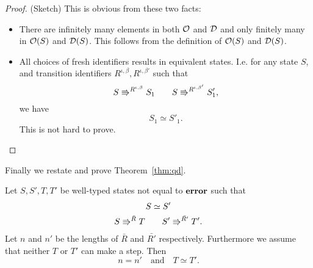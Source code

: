 \begin{proof}{(Sketch)}
  This is obvious from these two facts:
  \begin{itemize}
    \item There are infinitely many elements in both $\mathcal{O}$ and $\mathcal{D}$ and
      only finitely many in $\mathcal{O}(S)$ and $\mathcal{D}(S)$. This follows from
      the definition of $\mathcal{O}(S)$ and $\mathcal{D}(S)$.
    \item All choices of fresh identifiers results in equivalent states. I.e.
      for any state $S$, and transition identifiers $R^{\iota, \beta},
      R^{\iota, \beta'}$ such that 
      \begin{equation*}
        S \Rrightarrow^{R^{\iota, \beta}} S_1 \quad\quad S
        \Rrightarrow^{R^{\iota, \beta'}} S'_1,
      \end{equation*}
      we have
      \begin{equation*}
        S_1 \simeq S'_1.
      \end{equation*}
      This is not hard to prove.
  \end{itemize}
\end{proof}

Finally we restate and prove Theorem~\ref{thm:qd}.
\begin{theorem*}
  Let $S, S', T, T'$ be well-typed states not equal to $\mbox{{\bf error}}$ such that
  \begin{equation*}
    \begin{gathered}
      S \simeq S' \\
      S \Rrightarrow^{\bar{R}} T \quad\quad S' \Rrightarrow^{\bar{R'}} T'.
    \end{gathered}
  \end{equation*}
  Let $n$ and $n'$ be the lengths of $\bar{R}$ and $\bar{R'}$ respectively.
  Furthermore we assume that neither $T$ or $T'$ can make a step.  Then
  \begin{equation*}
    n = n' \quad \text{and} \quad T \simeq T'.
  \end{equation*}
\end{theorem*}

